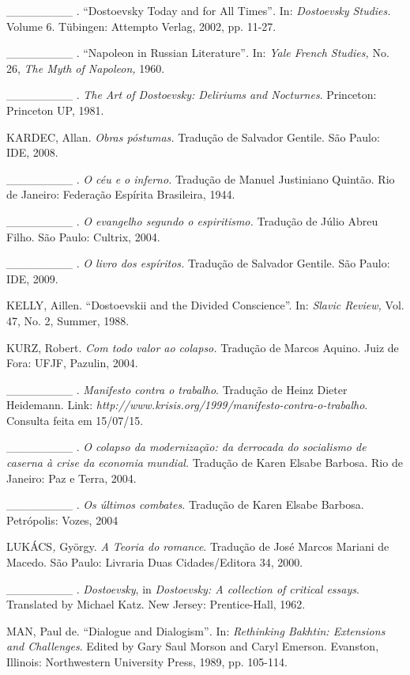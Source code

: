 \_\_\_\_\_\_\_\_ . ``Dostoevsky Today and for All Times''\emph{.} In:
\emph{Dostoevsky Studies.} Volume 6. Tübingen: Attempto Verlag, 2002,
pp. 11-27.

\_\_\_\_\_\_\_\_ . ``Napoleon in Russian Literature''\emph{.} In:
\emph{Yale French Studies,} No. 26, \emph{The Myth of Napoleon,} 1960.

\_\_\_\_\_\_\_\_ . \emph{The Art of Dostoevsky: Deliriums and
Nocturnes}. Princeton: Princeton UP, 1981.

KARDEC, Allan. \emph{Obras póstumas.} Tradução de Salvador Gentile. São
Paulo: IDE, 2008.

\_\_\_\_\_\_\_\_ . \emph{O céu e o inferno.} Tradução de Manuel
Justiniano Quintão. Rio de Janeiro: Federação Espírita Brasileira, 1944.

\_\_\_\_\_\_\_\_ . \emph{O evangelho segundo o espiritismo.} Tradução de
Júlio Abreu Filho. São Paulo: Cultrix, 2004.

\_\_\_\_\_\_\_\_ . \emph{O livro dos espíritos.} Tradução de Salvador
Gentile. São Paulo: IDE, 2009.

KELLY, Aillen. ``Dostoevskii and the Divided Conscience''. In:
\emph{Slavic Review,} Vol. 47, No. 2, Summer, 1988.

KURZ, Robert. \emph{Com todo valor ao colapso.} Tradução de Marcos
Aquino. Juiz de Fora: UFJF, Pazulin, 2004.

\_\_\_\_\_\_\_\_ . \emph{Manifesto contra o trabalho}. Tradução de Heinz
Dieter Heidemann. Link:
\emph{http://www.krisis.org/1999/manifesto-contra-o-trabalho}.
Consulta feita em 15/07/15.

\_\_\_\_\_\_\_\_ . \emph{O colapso da modernização: da derrocada do
socialismo de caserna à crise da economia mundial.} Tradução de Karen
Elsabe Barbosa. Rio de Janeiro: Paz e Terra, 2004.

\_\_\_\_\_\_\_\_ . \emph{Os últimos combates.} Tradução de Karen Elsabe
Barbosa. Petrópolis: Vozes, 2004

LUKÁCS\emph{,} György. \emph{A Teoria do romance}. Tradução de José
Marcos Mariani de Macedo. São Paulo: Livraria Duas Cidades/Editora 34,
2000.

\_\_\_\_\_\_\_\_ . \emph{Dostoevsky}, in \emph{Dostoevsky: A collection
of critical essays}. Translated by Michael Katz. New Jersey:
Prentice-Hall, 1962.

MAN, Paul de. ``Dialogue and Dialogism''\emph{.} In: \emph{Rethinking
Bakhtin: Extensions and Challenges}. Edited by Gary Saul Morson and
Caryl Emerson. Evanston, Illinois: Northwestern University Press, 1989,
pp. 105-114.

